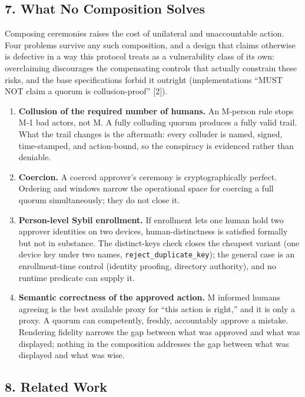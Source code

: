 \documentclass[
  11pt,
]{article}
\providecommand{\tightlist}{%
  \setlength{\itemsep}{0pt}\setlength{\parskip}{0pt}}
\begin{document}
\subsection{7. What No Composition Solves}\label{what-no-composition-solves}

Composing ceremonies raises the cost of unilateral and unaccountable
action. Four problems survive any such composition, and a design that
claims otherwise is defective in a way this protocol treats as a
vulnerability class of its own: overclaiming discourages the
compensating controls that actually constrain these risks, and the base
specifications forbid it outright (implementations ``MUST NOT claim a
quorum is collusion-proof'' {[}2{]}).

\begin{enumerate}
\def\labelenumi{\arabic{enumi}.}
\tightlist
\item
  \textbf{Collusion of the required number of humans.} An M-person rule
  stops M-1 bad actors, not M. A fully colluding quorum produces a fully
  valid trail. What the trail changes is the aftermath: every colluder
  is named, signed, time-stamped, and action-bound, so the conspiracy is
  evidenced rather than deniable.
\item
  \textbf{Coercion.} A coerced approver's ceremony is cryptographically
  perfect. Ordering and windows narrow the operational space for
  coercing a full quorum simultaneously; they do not close it.
\item
  \textbf{Person-level Sybil enrollment.} If enrollment lets one human
  hold two approver identities on two devices, human-distinctness is
  satisfied formally but not in substance. The distinct-keys check
  closes the cheapest variant (one device key under two names,
  \texttt{reject\_duplicate\_key}); the general case is an
  enrollment-time control (identity proofing, directory authority), and
  no runtime predicate can supply it.
\item
  \textbf{Semantic correctness of the approved action.} M informed
  humans agreeing is the best available proxy for ``this action is
  right,'' and it is only a proxy. A quorum can competently, freshly,
  accountably approve a mistake. Rendering fidelity narrows the gap
  between what was approved and what was displayed; nothing in the
  composition addresses the gap between what was displayed and what was
  wise.
\end{enumerate}

\subsection{8. Related Work}\label{related-work}
\end{document}
